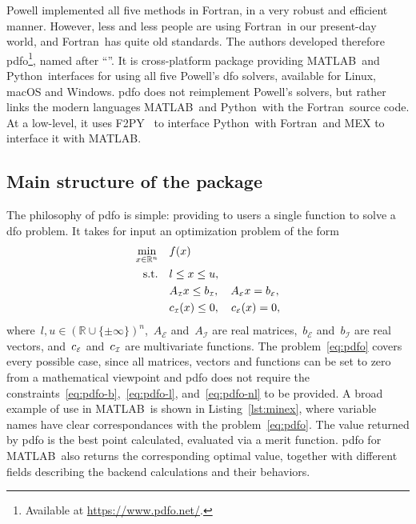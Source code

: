 \documentclass[11pt,draft]{article}
\numberwithin{equation}{section}
\newcommand{\R}{\mathbb{R}}
\newcommand{\set}[2][]{#1\{#2#1\}}
\newcommand{\aeq}{A_{\scriptscriptstyle\mathcal{E}}}
\newcommand{\aub}{A_{\scriptscriptstyle\mathcal{I}}}
\newcommand{\beq}{b_{\scriptscriptstyle\mathcal{E}}}
\newcommand{\bub}{b_{\scriptscriptstyle\mathcal{I}}}
\newcommand{\con}[1][i]{c\ifthenelse{\equal{#1}{}}{}{_{#1}}}
\newcommand{\ceq}{\con[\scriptscriptstyle\mathcal{E}]}
\newcommand{\cub}{\con[\scriptscriptstyle\mathcal{I}]}
\newcommand{\obj}{f}
\newcommand{\st}{\text{s.t.}}
\newcommand{\xl}{l}
\newcommand{\xu}{u}
\def\fortran{\mbox{Fortran}}
\def\matlab{\mbox{MATLAB}}
\def\python{\mbox{Python}}
\begin{document}
Powell implemented all five methods in \fortran, in a very robust and efficient manner.
However, less and less people are using \fortran\ in our present-day world, and \fortran\ has quite old standards.
The authors developed therefore \gls{pdfo}\footnote{Available at \url{https://www.pdfo.net/}.}, named after \enquote{}.
It is cross-platform package providing \matlab\ and \python\ interfaces for using all five Powell's \gls{dfo} solvers, available for Linux, macOS and Windows.
\Gls{pdfo} does not reimplement Powell's solvers, but rather links the modern languages \matlab\ and \python\ with the \fortran\ source code.
At a low-level, it uses F2PY~\cite{Peterson_2009} to interface \python\ with \fortran\, and MEX to interface it with \matlab.

\subsection{Main structure of the package}

The philosophy of \gls{pdfo} is simple: providing to users a single function to solve a \gls{dfo} problem.
It takes for input an optimization problem of the form
\begin{subequations}
    \label{eq:pdfo}
    \begin{align}
        \min_{x \in \R^n}   & \quad \obj(x)\\
        \st        & \quad \xl \le x \le \xu, \label{eq:pdfo-b}\\
        & \quad \aub x \le \bub, \quad \aeq x = \beq, \label{eq:pdfo-l}\\
        & \quad \cub(x) \le 0, \quad \ceq(x) = 0, \label{eq:pdfo-nl}
    \end{align}
\end{subequations}
where~$\xl, \xu \in (\R \cup \set{\pm \infty})^n$,~$\aeq$ and~$\aub$ are real matrices,~$\beq$ and~$\bub$ are real vectors, and~$\ceq$ and~$\cub$ are multivariate functions.
The problem~\eqref{eq:pdfo} covers every possible case, since all matrices, vectors and functions can be set to zero from a mathematical viewpoint and \gls{pdfo} does not require the constraints~\eqref{eq:pdfo-b},~\eqref{eq:pdfo-l}, and~\eqref{eq:pdfo-nl} to be provided.
A broad example of use in \matlab\ is shown in Listing~\ref{lst:minex}, where variable names have clear correspondances with the problem~\eqref{eq:pdfo}.
The value returned by \gls{pdfo} is the best point calculated, evaluated via a merit function.
\gls{pdfo} for \matlab\ also returns the corresponding optimal value, together with different fields describing the backend calculations and their behaviors.
\end{document}
